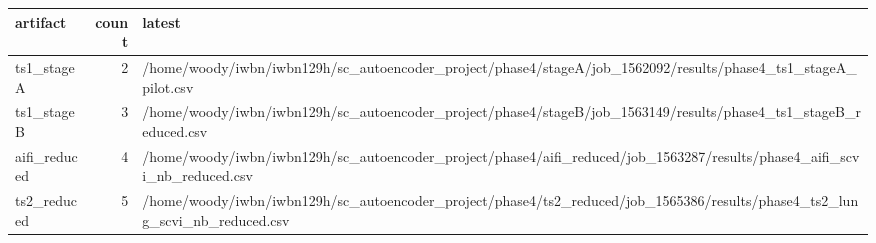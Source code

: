 \begin{tabular}{lrl}
\toprule
artifact & count & latest \\
\midrule
ts1\_stageA & 2 & /home/woody/iwbn/iwbn129h/sc\_autoencoder\_project/phase4/stageA/job\_1562092/results/phase4\_ts1\_stageA\_pilot.csv \\
ts1\_stageB & 3 & /home/woody/iwbn/iwbn129h/sc\_autoencoder\_project/phase4/stageB/job\_1563149/results/phase4\_ts1\_stageB\_reduced.csv \\
aifi\_reduced & 4 & /home/woody/iwbn/iwbn129h/sc\_autoencoder\_project/phase4/aifi\_reduced/job\_1563287/results/phase4\_aifi\_scvi\_nb\_reduced.csv \\
ts2\_reduced & 5 & /home/woody/iwbn/iwbn129h/sc\_autoencoder\_project/phase4/ts2\_reduced/job\_1565386/results/phase4\_ts2\_lung\_scvi\_nb\_reduced.csv \\
\bottomrule
\end{tabular}

